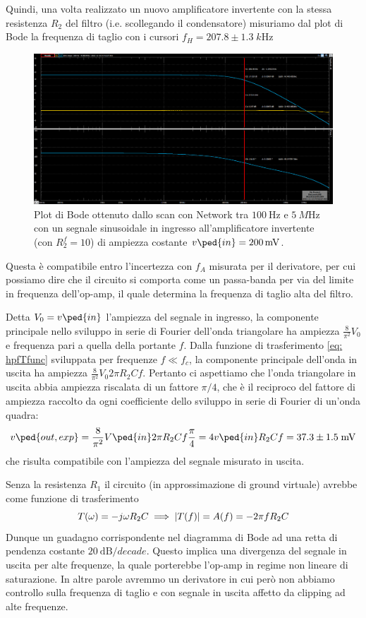 \documentclass[10pt, a4paper, italian]{article}
\begin{document}
Quindi, una volta realizzato un nuovo amplificatore invertente con la
stessa resistenza $R_2$ del filtro (i.e. scollegando il condensatore)
misuriamo dal plot di Bode la frequenza di taglio con i cursori
$f_H = 207.8 \pm 1.3 \; \si{k\Hz}$
\begin{figure}[htbp]
\centering
\includegraphics[scale=0.36]{ampinv10}
\caption{Plot di Bode ottenuto dallo scan con Network tra $\SI{100}{\Hz}$ e
$\SI{5}{M\Hz}$ con un segnale sinusoidale in ingresso all'amplificatore
invertente (con $R_2^f=10$) di ampiezza costante $v\ped{in} = \SI{200}{m\V}$.
\label{fig: ampinv10}}
\end{figure}

Questa è compatibile entro l'incertezza con $f_A$ misurata per il derivatore,
per cui possiamo dire che il circuito si comporta come un passa-banda per via
del limite in frequenza dell'op-amp, il quale determina la frequenza di taglio
alta del filtro.

Detta $V_{0} = v\ped{in} $ l'ampiezza del segnale in ingresso, la componente
principale nello sviluppo in serie di Fourier dell'onda triangolare ha ampiezza 
$\frac{8}{\pi^2} V_{0} $ e frequenza pari a quella della portante $f$.
Dalla funzione di trasferimento \eqref{eq: hpfTfunc} sviluppata per frequenze
$f \ll f_c$, la componente principale dell'onda in uscita ha ampiezza
$\frac{8}{\pi^2} V_{0} 2\pi R_2 C f $. Pertanto ci aspettiamo che l'onda
triangolare in uscita abbia ampiezza riscalata di un fattore $\pi/4$, che è
il reciproco del fattore di ampiezza raccolto da ogni coefficiente dello
sviluppo in serie di Fourier di un'onda quadra:
\[
v\ped{out, exp} = \frac{8}{\pi^{2}} V\ped{in} 2 \pi R_{2} C f \frac{\pi}{4} =
4 v\ped{in} R_{2} C f = 37.3 \pm 1.5 \; \si{m\V}
\]
che risulta compatibile con l'ampiezza del segnale misurato in uscita.

Senza la resistenza $R_1$ il circuito (in approssimazione di ground virtuale)
avrebbe come funzione di trasferimento
\[
T(\omega) = - j \omega R_2 C \implies
\left| T(f) \right| = A(f) =  - 2\pi f R_2 C
\]
Dunque un guadagno corrispondente nel diagramma di Bode ad una retta di
pendenza costante $\SI{20}{\deci\bel/decade}$.
Questo implica una divergenza del segnale in uscita per alte frequenze, la
quale porterebbe l'op-amp in regime non lineare di saturazione.
In altre parole avremmo un derivatore in cui però non abbiamo controllo sulla
frequenza di taglio e con segnale in uscita affetto da clipping ad alte
frequenze.
\end{document}
